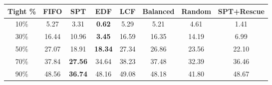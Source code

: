 \begin{tabular}{cccccccc}
\toprule
\textbf{Tight \%} & \textbf{FIFO} & \textbf{SPT} & \textbf{EDF} & \textbf{LCF} & \textbf{Balanced} & \textbf{Random} & \textbf{SPT+Rescue} \\
\midrule
10\% & 5.27 & 3.31 & \textbf{0.62} & 5.29 & 5.21 & 4.61 & 1.41\\
30\% & 16.44 & 10.96 & \textbf{3.45} & 16.59 & 16.35 & 14.19 & 6.99\\
50\% & 27.07 & 18.91 & \textbf{18.34} & 27.34 & 26.86 & 23.56 & 22.10\\
70\% & 37.84 & \textbf{27.56} & 34.64 & 38.23 & 37.48 & 32.39 & 36.46\\
90\% & 48.56 & \textbf{36.74} & 48.16 & 49.08 & 48.18 & 41.80 & 48.67\\
\bottomrule
\end{tabular}
